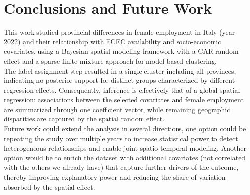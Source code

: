 \section{Conclusions and Future Work}
\label{sec:conclusions}

This work studied provincial differences in female employment in Italy (year 2022) and their relationship with ECEC availability and socio-economic covariates, using a Bayesian spatial modeling framework with a CAR random effect and a sparse finite mixture approach for model-based clustering.\\

The label-assignment step resulted in a single cluster including all provinces, indicating no posterior support for distinct groups characterized by different regression effects. Consequently, inference is effectively that of a global spatial regression: associations between the selected covariates and female employment are summarized through one coefficient vector, while remaining geographic disparities are
captured by the spatial random effect.\\

Future work could extend the analysis in several directions, one option could be repeating the study over multiple years to increase statistical power to detect heterogeneous relationships and enable joint spatio-temporal modeling. Another option would be to enrich the dataset with additional covariates (not correlated with the others we already have) that capture further drivers of the outcome, thereby improving explanatory power and reducing the share of variation absorbed by the spatial effect.\\


